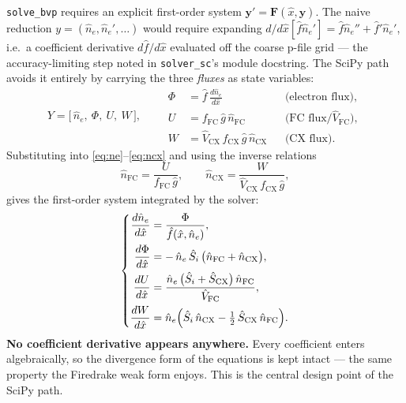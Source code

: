 \documentclass[11pt]{article}
\newcommand{\hn}{\hat{n}}
\newcommand{\hx}{\hat{x}}
\newcommand{\hg}{\hat{g}}
\newcommand{\hS}{\hat{S}}
\newcommand{\hV}{\hat{V}}
\newcommand{\hf}{\hat{f}}
\newcommand{\code}[1]{\texttt{#1}}
\begin{document}
\code{solve\_bvp} requires an explicit first-order system
$\mathbf{y}' = \mathbf{F}(\hx, \mathbf{y})$.  The naive reduction
$y = (\hn_e, \hn_e', \dots)$ would require expanding
$d/d\hx[\hf \hn_e']= \hf \hn_e'' + \hf' \hn_e'$, i.e.\ a coefficient
derivative $d\hf/d\hx$ evaluated off the coarse p-file grid --- the
accuracy-limiting step noted in \code{solver\_sc}'s module docstring.
The SciPy path avoids it entirely by carrying the three \emph{fluxes} as
state variables:
\begin{equation}
  Y = \bigl[\, \hn_e,\ \Phi,\ U,\ W \,\bigr],
  \qquad
  \begin{aligned}
    \Phi &= \hf\,\frac{d\hn_e}{d\hx}
          &&\text{(electron flux)},\\
    U    &= f_{\mathrm{FC}}\,\hg\,\hn_{\mathrm{FC}}
          &&\text{(FC flux}/\hV_{\mathrm{FC}}\text{)},\\
    W    &= \hV_{\mathrm{CX}}\,f_{\mathrm{CX}}\,\hg\,\hn_{\mathrm{CX}}
          &&\text{(CX flux)}.
  \end{aligned}
\end{equation}
Substituting into \eqref{eq:ne}--\eqref{eq:ncx} and using the inverse
relations
\begin{equation}
  \hn_{\mathrm{FC}} = \frac{U}{f_{\mathrm{FC}}\,\hg},
  \qquad
  \hn_{\mathrm{CX}} = \frac{W}{\hV_{\mathrm{CX}}\,f_{\mathrm{CX}}\,\hg},
  \label{eq:recover}
\end{equation}
gives the first-order system integrated by the solver:
\begin{equation}
\left\{
\begin{aligned}
  \frac{d\hn_e}{d\hx} &= \frac{\Phi}{\hf(\hx,\hn_e)},
    \\
  \frac{d\Phi}{d\hx}  &= -\,\hn_e\,\hS_i\,
    \bigl(\hn_{\mathrm{FC}} + \hn_{\mathrm{CX}}\bigr),
    \\
  \frac{dU}{d\hx}     &= \frac{\hn_e\,
    \bigl(\hS_i + \hS_{\mathrm{CX}}\bigr)\,\hn_{\mathrm{FC}}}
    {\hV_{\mathrm{FC}}},
    \\
  \frac{dW}{d\hx}     &= \hn_e\Bigl(\hS_i\,\hn_{\mathrm{CX}}
    - \tfrac{1}{2}\,\hS_{\mathrm{CX}}\,\hn_{\mathrm{FC}}\Bigr).
    
\end{aligned}
\right.
\label{eq:odesys}
\end{equation}
\textbf{No coefficient derivative appears anywhere.}  Every coefficient
enters algebraically, so the divergence form of the equations is kept
intact --- the same property the Firedrake weak form enjoys.  This is the
central design point of the SciPy path.
\end{document}

